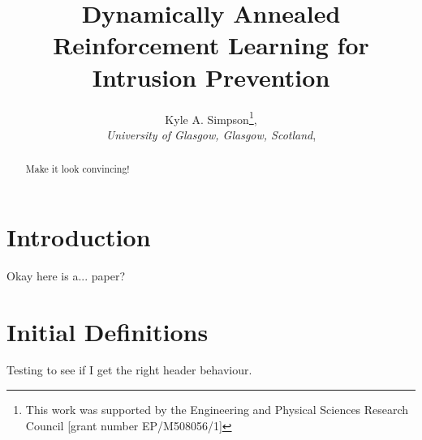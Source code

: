 \documentclass[conference,10pt]{IEEEtran}
\title{Dynamically Annealed Reinforcement Learning for Intrusion Prevention}
\author{Kyle A. Simpson\thanks{This work was supported by the Engineering and Physical Sciences
		Research Council [grant number EP/M508056/1]},\\\emph{University of Glasgow, Glasgow, Scotland},\\
		\email{k.simpson.1@research.gla.ac.uk}}
\date{}
\begin{document}

\maketitle

\begin{abstract}
	Make it look convincing!
\end{abstract}

\section{Introduction}

Okay here is a... paper?

\section{Initial Definitions}

Testing to see if I get the right header behaviour.

\printbibliography
\end{document}
